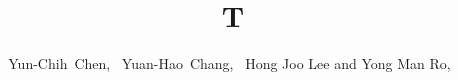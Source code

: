 \documentclass[journal]{IEEEtran}
\begin{document}
\title{T}
\author{Yun-Chih~Chen,~ Yuan-Hao~Chang,~
  Hong Joo Lee and Yong Man Ro,~}
\maketitle
\end{document}
